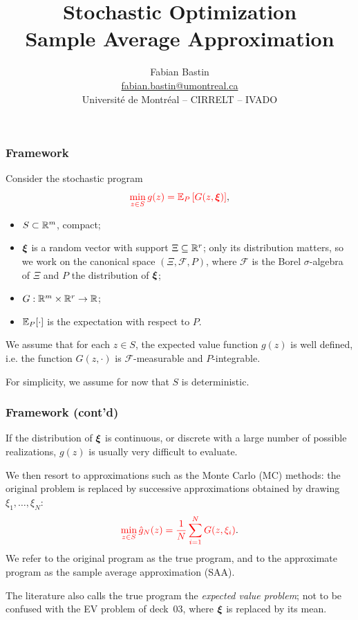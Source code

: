 \documentclass[aspectratio=169]{beamer}
\title[SAA]{Stochastic Optimization\\Sample Average Approximation}
\author[Fabian Bastin]{Fabian Bastin \\ \url{fabian.bastin@umontreal.ca} \\ Université de Montréal -- CIRRELT -- IVADO}
\date{}
\begin{document}
\frame{\titlepage}

\begin{frame}
\frametitle{Framework}

Consider the stochastic program
\[
{\color{red} \min_{z \in S} g(z) = {\mathbb{E}}_P \left[ G(z, {\boldsymbol{\xi}}) \right]},
\]
\vspace{-0.5cm}
\begin{itemize}
\item 
$S \subset \mathbb{R}^m$, compact;
\item
${\boldsymbol{\xi}}$ is a random vector with support $\Xi \subseteq \mathbb{R}^r$; only its distribution matters, so we work on the {\blue canonical space} $( \Xi, \mathcal{F}, P )$, where $\mathcal{F}$ is the Borel $\sigma$-algebra of $\Xi$ and $P$ the distribution of ${\boldsymbol{\xi}}$;
\item
$G: \mathbb{R}^m \times \mathbb{R}^r \rightarrow \mathbb{R}$;
\item
${\mathbb{E}}_P[\cdot]$ is the expectation with respect to $P$.
\end{itemize}

We assume that for each $z \in S$, the expected value function $g(z)$ is well defined, i.e. the function $G(z,\cdot)$ is $\mathcal{F}$-measurable and $P$-integrable.

\mbox{}

For simplicity, we assume for now that {\blue $S$ is deterministic}.

\end{frame}

\begin{frame}
\frametitle{Framework (cont'd)}

If the distribution of ${\boldsymbol{\xi}}$ is continuous, or discrete with a large number of possible realizations, $g(z)$ is usually very difficult to evaluate.

\mbox{}

We then resort to approximations such as the Monte Carlo (MC) methods: the original problem is replaced by successive approximations obtained by drawing $\xi_1,\ldots{}, \xi_N$:
\[
{\color{red} \min_{z \in S} \hat{g}_N(z) = \frac{1}{N} \sum_{i = 1}^N
  G(z, \xi_i)}.
\]
We refer to the original program as the {\blue true program}, and to the approximate program as the {\blue sample average approximation (SAA)}.

\mbox{}

{\footnotesize The literature also calls the true program the {\it expected value problem}; not to be confused with the EV problem of deck~03, where ${\boldsymbol{\xi}}$ is replaced by its mean.}

\end{frame}
\end{document}
